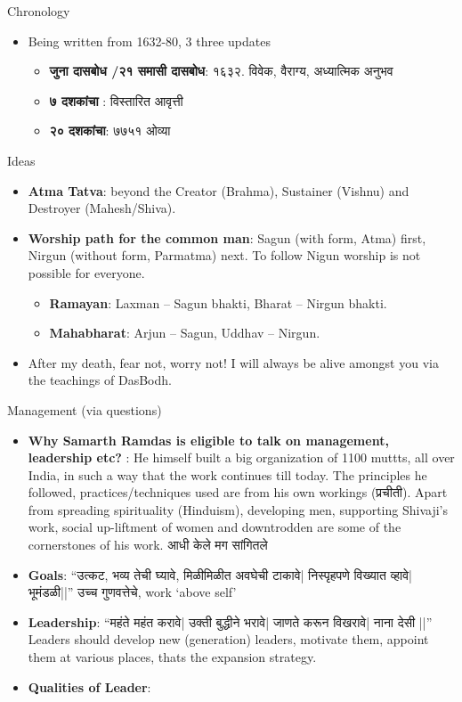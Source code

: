 Chronology

\begin{itemize}
\item Being written from 1632-80, 3 three updates
	\begin{itemize}
	\item \textbf{जुना दासबोध /२१ समासी दासबोध}: १६३२. विवेक, वैराग्य, अध्यात्मिक अनुभव 
	\item  \textbf{७ दशकांचा }: विस्तारित आवृत्ती 
	\item \textbf{२० दशकांचा}: ७७५१ ओव्या
	\end{itemize}

\end{itemize}

Ideas
\begin{itemize}
\item \textbf{Atma Tatva}: beyond the Creator (Brahma), Sustainer (Vishnu) and Destroyer (Mahesh/Shiva).
\item  \textbf{Worship path for the common man}: Sagun (with form, Atma) first, Nirgun (without form, Parmatma) next. To follow Nigun worship is not possible for everyone.
	\begin{itemize}
	\item \textbf{Ramayan}: Laxman – Sagun bhakti, Bharat – Nirgun bhakti.
	\item  \textbf{Mahabharat}: Arjun – Sagun, Uddhav – Nirgun.
	\end{itemize}
\item After my death, fear not, worry not! I will always be alive amongst you via the teachings of DasBodh.	
\end{itemize}

Management (via questions)
\begin{itemize}
\item \textbf{Why Samarth Ramdas is eligible to talk on management, leadership etc?} : He himself built a big organization of 1100 muttts, all over India, in such a way that the work  continues till today. The principles he followed, practices/techniques used are from his own workings (प्रचीती). Apart from spreading spirituality (Hinduism), developing men, supporting Shivaji's work, social up-liftment of women and downtrodden are some of the cornerstones of his work. आधी केले मग सांगितले 
\item  \textbf{Goals}: ``उत्कट, भव्य तेची घ्यावे, मिळीमिळीत अवघेची टाकावे| निस्पृहपणे विख्यात व्हावे| भूमंडळी||''  उच्च गुणवत्तेचे, work `above self'
\item \textbf{Leadership}: ``महंते महंत करावे| उक्ती बुद्धीने भरावे| जाणते करून विखरावे| नाना देसी ||'' Leaders should develop new (generation) leaders, motivate them, appoint them at various places, thats the expansion strategy.
\item \textbf{Qualities of Leader}: 
\end{itemize}

